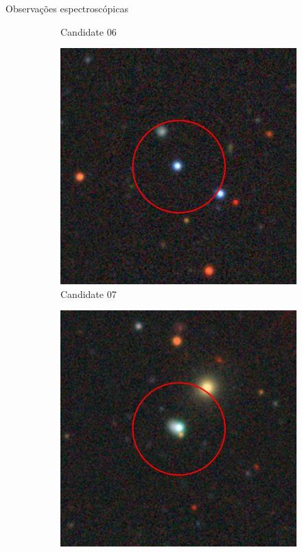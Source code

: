 \begin{frame}[c]{Observações espectroscópicas}
\begin{figure}
\begin{subfigure}[b]{0.11\textwidth}
        \caption{Candidate 06}
    \end{subfigure}
    \begin{subfigure}[b]{0.11\textwidth}
        \includegraphics[width=\textwidth]{images/proposatal_candidatas_1/UCG07.jpg}
        \caption{Candidate 07}
    \end{subfigure}
    \begin{subfigure}[b]{0.11\textwidth}
        \includegraphics[width=\textwidth]{images/proposatal_candidatas_1/UCG08.jpg}

\end{subfigure}
\end{figure}
\end{frame}
